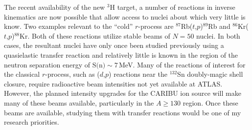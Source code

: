 {The recent availability of the new $^3$H target, a number of reactions in inverse kinematics are now possible that %
allow access to nuclei about which very little is know. Two examples relevant to the ``cold'' $r$-process are $^{87}$Rb($t$,$p$)$^{89}$Rb and $^{86}$Kr($t$,$p$)$^{88}$Kr. Both of these reactions utilize stable beams of $N=50$ nuclei. In both cases, the resultant nuclei have 
only once been studied previously using a quasielastic transfer reaction and relatively little is known in the region of the neutron separation energy of $\textrm{S(n)}\sim 7$\,MeV.
Many of the reactions of interest for the classical $r$-process, such as ($d$,$p$) reactions near the $^{132}$Sn doubly-magic shell closure, require radioactive beam intensities not yet available at ATLAS. However, the planned intensity upgrades for the CARIBU ion source will make many of these %
 beams available, particularly in the $A \geq 130$ region. Once these beams are available, studying them with transfer reactions would be one of my research priorities. 


%
%

}
